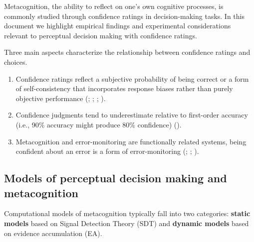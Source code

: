 \documentclass[
]{article}
\begin{document}
Metacognition, the ability to reflect on one's own cognitive processes,
is commonly studied through confidence ratings in decision-making tasks.
In this document we highlight empirical findings and experimental
considerations relevant to perceptual decision making with confidence
ratings.

Three main aspects characterize the relationship between confidence
ratings and choices.

\begin{enumerate}
\def\labelenumi{\arabic{enumi})}
\item
  Confidence ratings reflect a subjective probability of being correct
  or a form of self-consistency that incorporates response biases rather
  than purely objective performance
  (;
  ;
  ;
  ).
\item
  Confidence judgments tend to underestimate relative to first-order
  accuracy (i.e., 90\% accuracy might produce 80\% confidence)
  ().
\item
  Metacognition and error-monitoring are functionally related systems,
  being confident about an error is a form of error-monitoring
  (;
  ;
  ).
\end{enumerate}

\subsection{Models of perceptual decision making and
metacognition}\label{models-of-perceptual-decision-making-and-metacognition}

Computational models of metacognition typically fall into two
categories: \textbf{static models} based on Signal Detection Theory
(SDT) and \textbf{dynamic models} based on evidence accumulation (EA).
\end{document}
